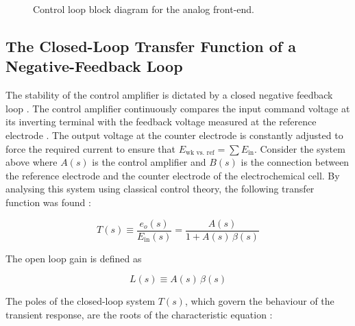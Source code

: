 \begin{figure}[H]
    \caption{Control loop block diagram for the analog front-end.}
    \label{fig:control_loop}
\end{figure}
 
\subsection{The Closed-Loop Transfer Function of a Negative-Feedback Loop}
\label{sec:closed-loop-tf}
 
The stability of the control amplifier is dictated by a closed negative feedback loop \cite{bard2001}. The control amplifier continuously compares the input command voltage at its inverting terminal with the feedback voltage measured at the reference electrode \cite{bard2001}. The output voltage at the counter electrode is constantly adjusted to force the required current to ensure that $E_{\text{wk vs.\ ref}} = \sum E_{\text{in}}$. Consider the system above where $A(s)$ is the control amplifier and $B(s)$ is the connection between the reference electrode and the counter electrode of the electrochemical cell. By analysing this system using classical control theory, the following transfer function was found \cite{c2}:
 
\begin{equation}
T(s) \equiv \frac{e_o(s)}{E_{\text{in}}(s)} = \frac{A(s)}{1+A(s)\,\beta(s)}
\label{eq:closed_loop_tf}
\end{equation}
 
The open loop gain is defined as
 
\begin{equation}
L(s) \equiv A(s)\,\beta(s)
\label{eq:loop_gain_def}
\end{equation}
 
The poles of the closed-loop system $T(s)$, which govern the behaviour of the transient response, are the roots of the characteristic equation \cite{c2}:
 
